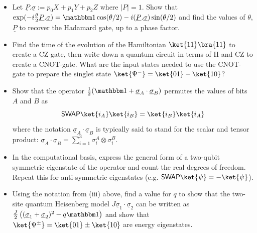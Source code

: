 \begin{myexercise} 
~
\begin{itemize}
 \item[(i)] Let $\underline{P}.\underline{\sigma} := p_0 X + p_1 Y + p_2 Z$ where $|P|=1$. Show that $\exp(-i\frac{\theta}{2}\underline{P}.\underline{\sigma})=\I \cos(\theta/2)-i(\underline{P}.\underline{\sigma})\sin(\theta/2)$ and find the values of $\theta$, $\underline{P}$ to recover the Hadamard gate, up to a phase factor.  

\item[(ii)] Find the time of the evolution of the Hamiltonian $\ket{11}\bra{11}$ to create a {\sf CZ}-gate, then write down a quantum circuit in terms of {\sf H}  and {\sf CZ} to create a {\sf CNOT}-gate.  What are the input states needed to use the {\sf CNOT}-gate to prepare the singlet state $\ket{\Psi^-}=\ket{01}-\ket{10}$?  

\item[(iii)] Show that the \swap{} operator $\frac{1}{2}(\I + \underline{\sigma}_A\cdot\underline{\sigma}_B)$ permutes the values of bits $A$ and $B$ as 
  \begin{equation}
   \text{\swap} \ket{i_A}\ket{i_B} = \ket{i_B}\ket{i_A}
  \end{equation}
  where the notation $ \underline{\sigma}_A\cdot\underline{\sigma}_B$ is typically said to stand for the scalar and tensor product:  
  $ \underline{\sigma}_A\cdot\underline{\sigma}_B = \sum_{i = 1}^3 \sigma_i^A \otimes \sigma_i^B.$ 

\item[(iv)] In the computational basis, express the general form of a two-qubit symmetric eigenstate of the \swap{} operator and count the real degrees of freedom.  Repeat this for anti-symmetric eigenstates (e.g. $\swap\ket{\psi}=-\ket{\psi}$).  
\item[(v)] Using the notation from (iii) above, find a value for $q$ to show that the two-site quantum Heisenberg model $J\underline{\sigma}_1\cdot \underline{\sigma}_2$ can be written as $\frac{J}{2}\left((\underline{\sigma}_1+\underline{\sigma}_2)^2-q\I\right)$ and show that $\ket{\Psi^\pm}=\ket{01}\pm\ket{10}$ are energy eigenstates.  
\end{itemize}
\end{myexercise}


